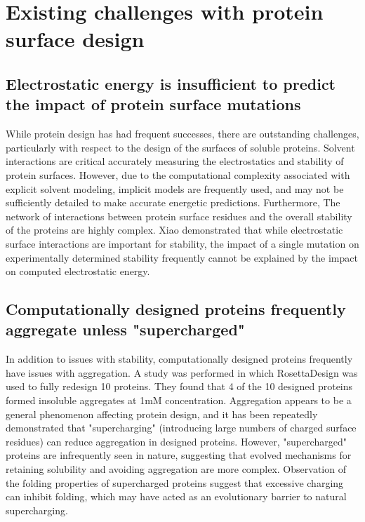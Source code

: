\section{Existing challenges with protein surface design}

\subsection{Electrostatic energy is insufficient to predict the impact of protein surface mutations}
While protein design has had frequent successes, there are outstanding challenges, particularly with respect to the design of the surfaces of soluble proteins.
Solvent interactions are critical accurately measuring the electrostatics and stability of protein surfaces\citep{Park:2004kn}.
However, due to the computational complexity associated with explicit solvent modeling, implicit models are frequently used, and may not be sufficiently detailed to make accurate energetic predictions.
Furthermore, The network of interactions between protein surface residues and the overall stability of the proteins are highly complex. 
Xiao\citep{Xiao:2013dq} demonstrated that while electrostatic surface interactions are important for stability, the impact of a single mutation on experimentally determined stability frequently cannot be explained by the impact on computed electrostatic energy.

\subsection{Computationally designed proteins frequently aggregate unless "supercharged"}
In addition to issues with stability, computationally designed proteins frequently have issues with aggregation.
A study was performed in which RosettaDesign was used to fully redesign 10 proteins\citep{Dantas:2003vt}.
They found that 4 of the 10 designed proteins formed insoluble aggregates at 1mM concentration.
Aggregation appears to be a general phenomenon affecting protein design, and it has been repeatedly demonstrated that "supercharging" (introducing large numbers of charged surface residues)\citep{Simeonov:2011jf,Kurnik:2012dz,MichaelSLawrence:2007cv} can reduce aggregation in designed proteins.
However, "supercharged" proteins are infrequently seen in nature, suggesting that evolved mechanisms for retaining solubility and avoiding aggregation are more complex.
Observation of the folding properties of supercharged proteins suggest that excessive charging can inhibit folding\citep{MichaelSLawrence:2007cv}, which may have acted as an evolutionary  barrier to natural supercharging.

